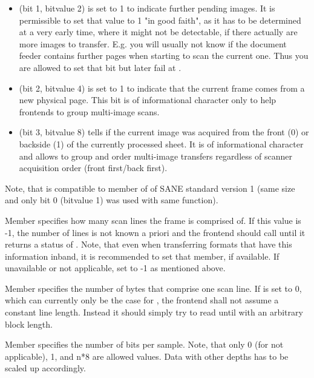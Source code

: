 \documentclass[11pt,DVIps]{report}
\begin{document}
\begin{changebar}
\begin{itemize}
\item
{} (bit 1, bitvalue 2) is set to 1 to indicate 
further pending images. It is permissible to set that value to 1 "in good 
faith", as it has to be determined at a very early time, where it might 
not be detectable, if there actually are more images to transfer. E.g. 
you will usually not know if the document feeder contains further pages 
when starting to scan the current one. Thus you are allowed to set that 
bit but later fail at .

\item
{} (bit 2, bitvalue 4) is set to 1 to indicate 
that the current frame comes from a new physical page. This bit is of 
informational character only to help frontends to group multi-image 
scans. 

\item
{} (bit 3, bitvalue 8) tells if the current image 
was acquired from the front (0) or backside (1) of the currently processed 
sheet. It is of informational character and allows to group and order 
multi-image transfers regardless of scanner acquisition order (front 
first/back first). 

\end{itemize}

Note, that  is compatible to member  of 
 of SANE standard version 1 (same size
and only bit 0 (bitvalue 1) was used with same function).



Member  specifies how many scan lines the frame is
comprised of.  If this value is -1, the number of lines is not known a
priori and the frontend should call  until it
returns a status of .
Note, that even when transferring formats that have this information 
inband, it is recommended to set that member, if available. If 
unavailable or not applicable, set to -1 as mentioned above. 

Member  specifies the number of bytes that
comprise one scan line.
If  is set to 0, which can currently only be the case for 
, the frontend shall not assume a constant line 
length. Instead it should simply try to read until 
with an arbitrary block length.

Member  specifies the number of bits per sample.
Note, that only 0 (for not applicable), 1, and n*8 are allowed 
values. Data with other depths has to be scaled up accordingly. 


\end{changebar}
\end{document}
